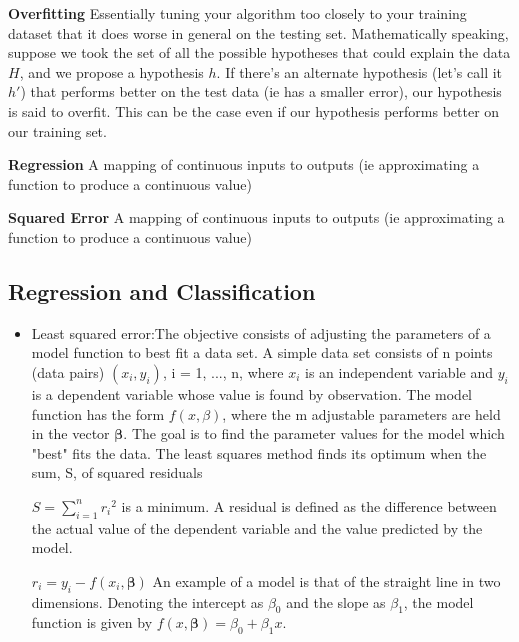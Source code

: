 \documentclass[11pt]{article}
\begin{document}
\par\noindent\hangindent=1cm \textbf{Overfitting} Essentially tuning your algorithm too closely to your training dataset that it does worse in general on the testing set. Mathematically speaking, suppose we took the set of all the possible hypotheses that could explain the data $H$, and we propose a hypothesis $h$. If there's an alternate hypothesis (let's call it $h'$) that performs better on the test data (ie has a smaller error), our hypothesis is said to overfit. This can be the case even if our hypothesis performs better on our training set.\\

\par\noindent\hangindent=1cm \textbf{Regression} A mapping of continuous inputs to outputs (ie approximating a function to produce a continuous value)\\

\par\noindent\hangindent=1cm \textbf{Squared Error} A mapping of continuous inputs to outputs (ie approximating a function to produce a continuous value)\\

\subsection{Regression and Classification}
\begin{itemize}
\item Least squared error:The objective consists of adjusting the parameters of a model function to best fit a data set. A simple data set consists of n points (data pairs) $(x_i,y_i)$, i = 1, ..., n, where $x_i$ is an independent variable and $y_i$ is a dependent variable whose value is found by observation. The model function has the form $f(x,\beta)$, where the m adjustable parameters are held in the vector $\boldsymbol \beta$. The goal is to find the parameter values for the model which "best" fits the data. The least squares method finds its optimum when the sum, S, of squared residuals

$S=\sum_{i=1}^{n}{r_i}^2$
is a minimum. A residual is defined as the difference between the actual value of the dependent variable and the value predicted by the model.

$r_i=y_i-f(x_i,\boldsymbol \beta)$
An example of a model is that of the straight line in two dimensions. Denoting the intercept as $\beta_0$ and the slope as $\beta_1$, the model function is given by $f(x,\boldsymbol \beta)=\beta_0+\beta_1 x$.
\end{itemize}
\end{document}
